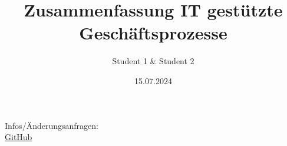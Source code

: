 \documentclass[a4paper,12pt]{article}
\title{Zusammenfassung IT gestützte Geschäftsprozesse}
\author{Student 1 \& Student 2}
\date{15.07.2024}
\begin{document}
\raggedright

\maketitle
\begin{center}
    {\Large Infos/Änderungsanfragen:} \\[1cm]
    \href{https://github.com/gerritkonrad/Zusammenfassung-IT-Geschaeftsprozesse}{GitHub}
\end{center}

\newpage

\tableofcontents

\newpage























\end{document}

